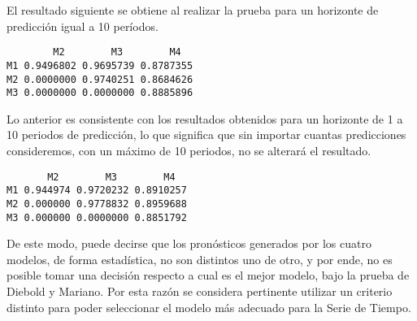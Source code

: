 \documentclass{article}
\theoremstyle{remark}
\begin{document}
El resultado siguiente se obtiene al realizar la prueba para un horizonte de predicción igual a 10 períodos.
\begin{verbatim}
        M2        M3        M4
M1 0.9496802 0.9695739 0.8787355
M2 0.0000000 0.9740251 0.8684626
M3 0.0000000 0.0000000 0.8885896
\end{verbatim}
Lo anterior es consistente con los resultados obtenidos para un horizonte de 1 a 10 periodos de predicción, lo que significa que sin importar cuantas predicciones consideremos, con un máximo de 10 periodos, no se alterará el resultado.  
\begin{verbatim}
       M2        M3        M4
M1 0.944974 0.9720232 0.8910257
M2 0.000000 0.9778832 0.8959688
M3 0.000000 0.0000000 0.8851792
\end{verbatim} 

De este modo, puede decirse que los pronósticos generados por los cuatro modelos, de forma estadística, no son distintos uno de otro, y por ende, no es posible tomar una decisión respecto a cual es el mejor modelo, bajo la prueba de Diebold y Mariano. Por esta razón se considera pertinente utilizar un criterio distinto para poder seleccionar el modelo más adecuado para la Serie de Tiempo.  
\newpage
\end{document}
